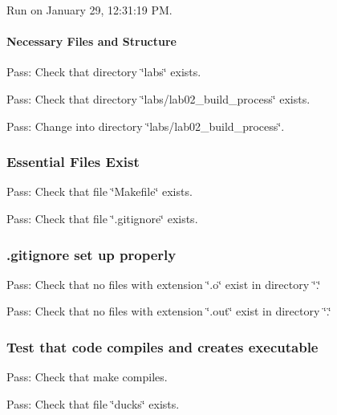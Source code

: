 Run on January 29, 12\+:31\+:19 PM.

\paragraph*{Necessary Files and Structure}


\begin{DoxyItemize}
\item Pass\+: Check that directory \char`\"{}labs\char`\"{} exists.
\item Pass\+: Check that directory \char`\"{}labs/lab02\+\_\+build\+\_\+process\char`\"{} exists.
\item Pass\+: Change into directory \char`\"{}labs/lab02\+\_\+build\+\_\+process\char`\"{}.
\end{DoxyItemize}

\subsubsection*{Essential Files Exist}


\begin{DoxyItemize}
\item Pass\+: Check that file \char`\"{}\+Makefile\char`\"{} exists.
\item Pass\+: Check that file \char`\"{}.\+gitignore\char`\"{} exists.
\end{DoxyItemize}

\subsubsection*{.gitignore set up properly}


\begin{DoxyItemize}
\item Pass\+: Check that no files with extension \char`\"{}.\+o\char`\"{} exist in directory \char`\"{}.\char`\"{}
\item Pass\+: Check that no files with extension \char`\"{}.\+out\char`\"{} exist in directory \char`\"{}.\char`\"{}
\end{DoxyItemize}

\subsubsection*{Test that code compiles and creates executable}


\begin{DoxyItemize}
\item Pass\+: Check that make compiles.
\item Pass\+: Check that file \char`\"{}ducks\char`\"{} exists. 
\end{DoxyItemize}